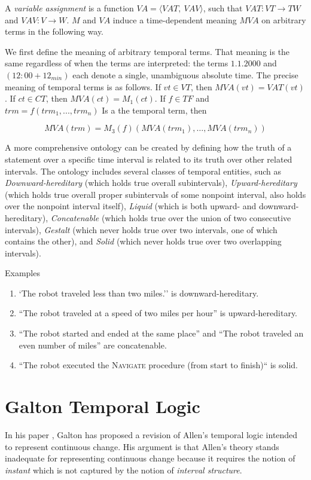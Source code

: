 A \textit{variable assignment} is a function $ VA = \langle VAT,\ VAV \rangle$, such that $VAT: VT \to TW$ and
$VAV: V \to W$. $M$ and $VA$ induce a time-dependent meaning $MVA$ on arbitrary terms in the following way.

We first define the meaning of arbitrary temporal terms. That meaning is the same regardless of when the terms are interpreted: the terms $1.1.2000$ and
$(12:00 + 12_{min})$ each denote a single, unambiguous absolute time. The precise
meaning of temporal terms is as follows. If $vt \in VT $, then $MVA (vt) = VAT (vt)$.
If $ct \in CT$, then $MVA (ct) = M_1(ct)$. If $f \in T F$ and $trm = f(trm_1, . . . , trm_n)$ Is a
the temporal term, then

\[
	MVA(trm) = M_3(f)(MVA(trm_1), \dots, MVA(trm_n))
\]

A more comprehensive ontology can be created by defining how the truth of a statement over a specific time interval is related to its truth over other related intervals.
The ontology includes several classes of temporal entities, such as \textit{Downward-hereditary} (which holds true overall subintervals), \textit{Upward-hereditary} (which holds true overall proper subintervals of some nonpoint interval, also holds over the nonpoint interval itself),
\textit{Liquid} (which is both upward- and downward-hereditary), \textit{Concatenable} (which holds true over the union of two consecutive intervals),
\textit{Gestalt} (which never holds true over two intervals, one of which contains the other), and \textit{Solid} (which never holds true over two overlapping intervals).

\begin{exmp} Examples
	\begin{enumerate}
		\item `The robot traveled less than two miles.'' is downward-hereditary.
		\item ``The robot traveled at a speed of two miles per hour'' is upward-hereditary.
		\item ``The robot started and ended at the same place'' and ``The robot traveled an even number of miles'' are concatenable.
    \item ``The robot executed the \textsc{Navigate} procedure (from start to finish)`` is solid.
	\end{enumerate}
\end{exmp}


\section{Galton Temporal Logic}
In his paper \cite{galton2004}, Galton has proposed a revision of Allen's temporal logic intended to represent continuous change.
His argument is that Allen's theory stands inadequate for representing continuous change because it requires the notion of \textit{instant} which is not captured by the notion of \textit{interval structure}.

